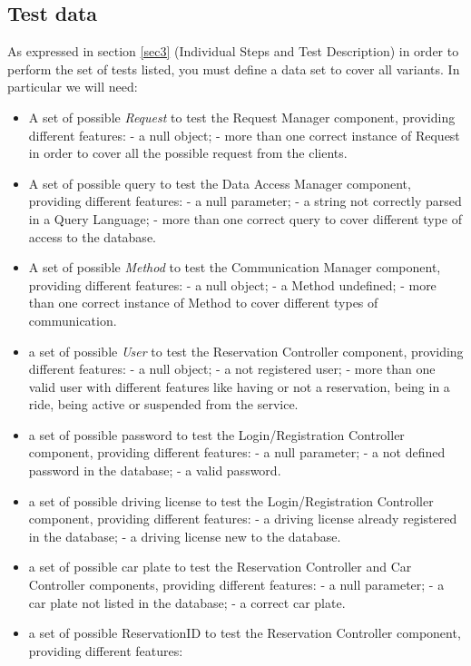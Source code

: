 \documentclass[10pt, a4paper,titlepage]{article}
\begin{document}
\subsection{Test data}
As expressed in section \ref{sec3} (Individual Steps and Test Description) in order to perform the set of tests listed, you must define a data set to cover all variants.
In particular we will need:
\begin{itemize}
\item A set of possible \emph{Request} to test the Request Manager component, providing different features:
\subitem - a null object;
\subitem - more than one correct instance of Request in order to cover all the possible request from the clients.
\item A set of possible query to test the Data Access Manager component, providing different features:
\subitem - a null parameter;
\subitem - a string not correctly parsed in a Query Language;
\subitem - more than one correct query to cover different type of access to the database.
\item A set of possible \emph{Method} to test the Communication Manager component, providing different features:
\subitem - a null object;
\subitem - a Method undefined;
\subitem - more than one correct instance of Method to cover different types of communication.
\item a set of possible \emph{User} to test the Reservation Controller component, providing different features:
\subitem - a null object;
\subitem - a not registered user;
\subitem - more than one valid user with different features like having or not a reservation, being in a ride, being active or suspended from the service.
\item a set of possible password to test the Login/Registration Controller component, providing different features:
\subitem - a null parameter;
\subitem - a not defined password in the database;
\subitem - a valid password.
\item a set of possible driving license to test the Login/Registration Controller component, providing different features:
\subitem - a driving license already registered in the database;
\subitem - a driving license new to the database.
\item a set of possible car plate to test the Reservation Controller and Car Controller components, providing different features:
\subitem - a null parameter;
\subitem - a car plate not listed in the database;
\subitem - a correct car plate.
\item a set of possible ReservationID to test the Reservation Controller component, providing different features:

\end{itemize}
\end{document}
